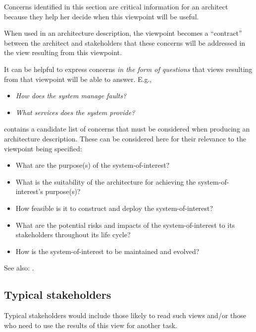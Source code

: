 Concerns identified in this section are critical information for an
architect because they help her decide when this viewpoint will be
useful.

When used in an architecture description, the viewpoint becomes a
``contract'' between the architect and stakeholders that these
concerns will be addressed in the view resulting from this viewpoint.

It can be helpful to express concerns \emph{in the form of questions}
that views resulting from that viewpoint will be able to answer. E.g.,
\begin{itemize}
\item \textit{How does the system manage faults?}
\item \textit{What services does the system provide?}
\end{itemize}

 
 contains a candidate list of concerns that must be considered
when producing an architecture description. These can be considered
here for their relevance to the viewpoint being specified:
\begin{itemize}
\item What are the purpose(s) of the system-of-interest?
\item What is the suitability of the architecture for achieving the
  system-of-interest's purpose(s)?
\item How feasible is it to construct and deploy the
  system-of-interest?
\item What are the potential risks and impacts of the
  system-of-interest to its stakeholders throughout its life cycle?
\item How is the system-of-interest to be maintained and evolved?
\end{itemize}

See also: .

\subsection{Typical stakeholders} 


Typical stakeholders would include those likely to read such views
and/or those who need to use the results of this view for another
task.

